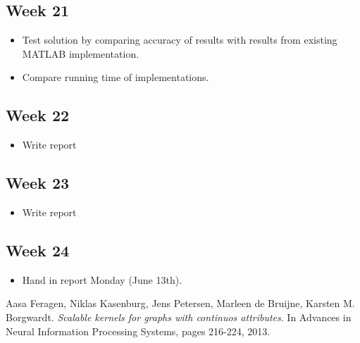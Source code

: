\documentclass{article}
\begin{document}
\subsection{Week 21}
\begin{itemize}
	\item Test solution by comparing accuracy of results with results from existing MATLAB implementation.
	\item Compare running time of implementations.
\end{itemize}
\subsection{Week 22}
\begin{itemize}
	\item Write report
\end{itemize}
\subsection{Week 23}
\begin{itemize}
	\item Write report
\end{itemize}
\subsection{Week 24}
\begin{itemize}
	\item Hand in report Monday (June 13th).
\end{itemize}


\newpage
\renewcommand\refname{References}
\begin{thebibliography}{9}
	Aasa Feragen, Niklas Kasenburg, Jens Petersen, Marleen de Bruijne, Karsten M. Borgwardt.
	\emph{Scalable kernels for graphs with continuos attributes}.
	In Advances in Neural Information Processing Systems, pages 216-224, 2013.
\end{thebibliography}
\end{document}
